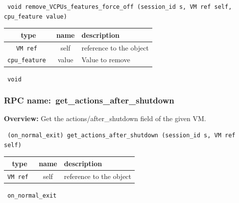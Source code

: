 \begin{verbatim} void remove_VCPUs_features_force_off (session_id s, VM ref self, cpu_feature value)\end{verbatim}



 
\vspace{0.3cm}
\begin{tabular}{|c|c|p{7cm}|}
 \hline
{\bf type} & {\bf name} & {\bf description} \\ \hline
{\tt VM ref } & self & reference to the object \\ \hline 

{\tt cpu\_feature } & value & Value to remove \\ \hline 

\end{tabular}

\vspace{0.3cm}

{\tt 
void
}



\vspace{0.3cm}
\vspace{0.3cm}
\vspace{0.3cm}
\subsubsection{RPC name:~get\_actions\_after\_shutdown}

{\bf Overview:} 
Get the actions/after\_shutdown field of the given VM.

\begin{verbatim} (on_normal_exit) get_actions_after_shutdown (session_id s, VM ref self)\end{verbatim}



 
\vspace{0.3cm}
\begin{tabular}{|c|c|p{7cm}|}
 \hline
{\bf type} & {\bf name} & {\bf description} \\ \hline
{\tt VM ref } & self & reference to the object \\ \hline 

\end{tabular}

\vspace{0.3cm}

{\tt 
on\_normal\_exit
}


